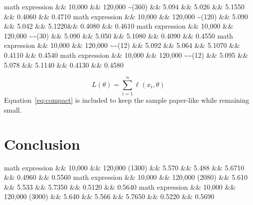 \documentclass[11pt]{article}
\begin{document}
math expression \&\& 10,000 \&\& 120,000 \textasciitilde{}(360) \&\& 5.094 \&\& 5.026 \&\& 5.1550 \&\& 0.4060 \&\& 0.4710 math expression \&\& 10,000 \&\& 120,000 \textasciitilde{}(120) \&\& 5.090 \&\& 5.042 \&\& 5.1220\&\& 0.4080 \&\& 0.4610 math expression \&\& 10,000 \&\& 120,000 \textasciitilde{}\textasciitilde{}(30) \&\& 5.090 \&\& 5.050 \&\& 5.1080 \&\& 0.4090 \&\& 0.4550 math expression \&\& 10,000 \&\& 120,000 \textasciitilde{}\textasciitilde{}(12) \&\& 5.092 \&\& 5.064 \&\& 5.1070 \&\& 0.4110 \&\& 0.4540 math expression \&\& 10,000 \&\& 120,000 \textasciitilde{}\textasciitilde{}(12) \&\& 5.095 \&\& 5.078 \&\& 5.1140 \&\& 0.4130 \&\& 0.4580

\begin{equation}
\label{eq:compact}
L(\theta) = \sum_{i=1}^{n} \ell(x_i, \theta)
\end{equation}
Equation~\ref{eq:compact} is included to keep the sample paper-like while remaining small.

\section{Conclusion}

math expression \&\& 10,000 \&\& 120,000 (1300) \&\& 5.570 \&\& 5.488 \&\& 5.6710 \&\& 0.4960 \&\& 0.5560 math expression \&\& 10,000 \&\& 120,000 (2080) \&\& 5.610 \&\& 5.533 \&\& 5.7350 \&\& 0.5120 \&\& 0.5640 math expression \&\& 10,000 \&\& 120,000 (3000) \&\& 5.640 \&\& 5.566 \&\& 5.7650 \&\& 0.5220 \&\& 0.5690
\end{document}
